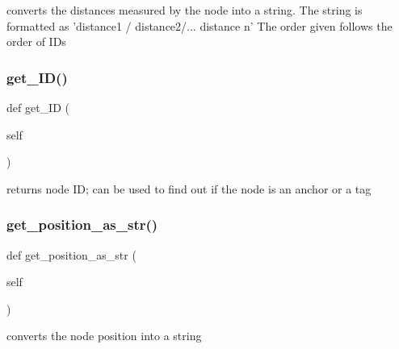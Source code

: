 \begin{DoxyVerb}converts the distances measured by the node into a string.
The string is formatted as 'distance1 / distance2/... distance n'
The order given follows the order of IDs\end{DoxyVerb}
 \mbox{\label{class_rendering_1_1_rendered_node_a09f3f97175c16ea6025da871f653d416}} 
\subsubsection{\texorpdfstring{get\+\_\+\+I\+D()}{get\_ID()}}
{\footnotesize\ttfamily def get\+\_\+\+ID (\begin{DoxyParamCaption}\item[{}]{self }\end{DoxyParamCaption})}

\begin{DoxyVerb}returns node ID; can be used to find out if the node is an anchor or a tag\end{DoxyVerb}
 \mbox{\label{class_rendering_1_1_rendered_node_a2456c7486bc468bd6b0e9277336f6453}} 
\subsubsection{\texorpdfstring{get\+\_\+position\+\_\+as\+\_\+str()}{get\_position\_as\_str()}}
{\footnotesize\ttfamily def get\+\_\+position\+\_\+as\+\_\+str (\begin{DoxyParamCaption}\item[{}]{self }\end{DoxyParamCaption})}

\begin{DoxyVerb}converts the node position into a string\end{DoxyVerb}
 \mbox{\label{class_rendering_1_1_rendered_node_ac3c535fd36dc5473ff98017920898352}} 
